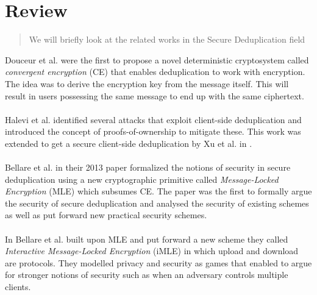 \chapter{Review}
\label{chap:review}

\begin{quote} \small
	We will briefly look at the related works in the Secure Deduplication field
\end{quote}

Douceur et al. \cite{convergentEnc} were the first to propose a novel deterministic cryptosystem
called \textit{convergent encryption} (CE) that enables deduplication to work with
encryption. The idea was to derive the encryption key from the message itself. This
will result in users possessing the same message to end up with the same ciphertext.
\\ \\
Halevi et al. \cite{proofOwner} identified several attacks that exploit client-side
deduplication and introduced the concept of proofs-of-ownership to mitigate these. This
work was extended to get a secure client-side deduplication by Xu et al. in \cite{weakLeakage}.
\\ \\
Bellare et al. in their 2013 paper \cite{mle} formalized the notions of security
in secure deduplication using a new cryptographic primitive called 
\textit{Message-Locked Encryption} (MLE) which subsumes CE. 
The paper was the first to formally argue
the security of secure deduplication and analysed the security of existing schemes as
well as put forward new practical security schemes.
\\ \\
In \cite{imle} Bellare et al. built upon MLE and put forward a new scheme they called
\textit{Interactive Message-Locked Encryption} (iMLE) in which upload and download are
protocols. They modelled privacy and security as games that enabled to argue for stronger notions
of security such as when an adversary controls multiple clients.